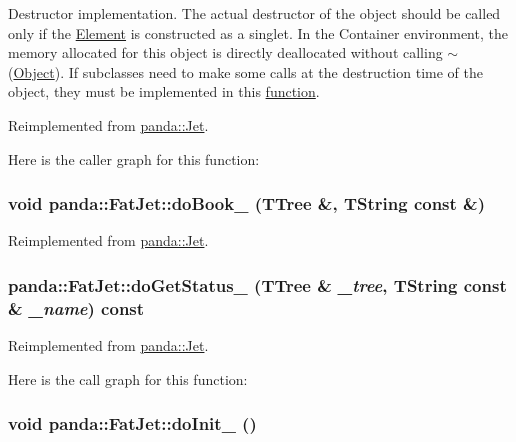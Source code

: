 Destructor implementation. The actual destructor of the object should be called only if the \hyperlink{classpanda_1_1Element}{Element} is constructed as a singlet. In the Container environment, the memory allocated for this object is directly deallocated without calling $\sim$(\hyperlink{classpanda_1_1Object}{Object}). If subclasses need to make some calls at the destruction time of the object, they must be implemented in this \hyperlink{namespacepanda_1_1function}{function}. 

Reimplemented from \hyperlink{classpanda_1_1Jet_adbd430a93e346588348e1eebaa90c42a}{panda::Jet}.

Here is the caller graph for this function:\hypertarget{classpanda_1_1FatJet_a32dbcd6e7cf31c79aed92220c43daed7}{
\subsubsection[{doBook\_\-}]{\setlength{\rightskip}{0pt plus 5cm}void panda::FatJet::doBook\_\- (TTree \&, \/  TString const \&)}}
\label{classpanda_1_1FatJet_a32dbcd6e7cf31c79aed92220c43daed7}


Reimplemented from \hyperlink{classpanda_1_1Jet_a9f7d21237e7933ee156f5edea6a27696}{panda::Jet}.\hypertarget{classpanda_1_1FatJet_a96835f1d5e56985c033cc73029dccef0}{
\subsubsection[{doGetStatus\_\-}]{ panda::FatJet::doGetStatus\_\- (TTree \& {\em \_\-tree}, \/  TString const \& {\em \_\-name}) const}}
\label{classpanda_1_1FatJet_a96835f1d5e56985c033cc73029dccef0}


Reimplemented from \hyperlink{classpanda_1_1Jet_a4ecbac39b42fe464f6346711aed38aba}{panda::Jet}.

Here is the call graph for this function:\hypertarget{classpanda_1_1FatJet_aae0c0b4e50cf6aae1d6c12b31d8585d9}{
\subsubsection[{doInit\_\-}]{\setlength{\rightskip}{0pt plus 5cm}void panda::FatJet::doInit\_\- ()}}
\label{classpanda_1_1FatJet_aae0c0b4e50cf6aae1d6c12b31d8585d9}


